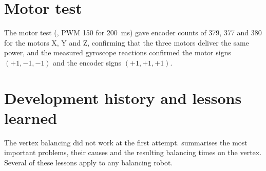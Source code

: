 \section{Motor test}

The motor test (, PWM 150 for \SI{200}{ms}) gave encoder counts of 379, 377 and 380
for the motors X, Y and Z, confirming that the three motors deliver the same power, and the
measured gyroscope reactions confirmed the motor signs $(+1, -1, -1)$ and the encoder signs
$(+1, +1, +1)$.

\section{Development history and lessons learned}
\label{sec:history}

The vertex balancing did not work at the first attempt.  summarises the most
important problems, their causes and the resulting balancing times on the vertex. Several of these
lessons apply to any balancing robot.

